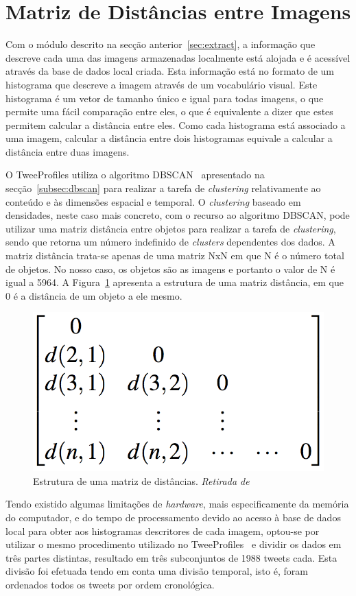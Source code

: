 \section{Matriz de Distâncias entre Imagens}\label{sec:matdist}

Com o módulo descrito na secção anterior~\ref{sec:extract}, a informação que descreve cada uma das imagens armazenadas localmente está alojada e é acessível através da base de dados local criada. Esta informação está no formato de um histograma que descreve a imagem através de um vocabulário visual. Este histograma é um vetor de tamanho único e igual para todas imagens, o que permite uma fácil comparação entre eles, o que é equivalente a dizer que estes permitem calcular a distância entre eles. Como cada histograma está associado a uma imagem, calcular a distância entre dois histogramas equivale a calcular a distância entre duas imagens.

O TweeProfiles utiliza o algoritmo DBSCAN~\cite{Han2006} apresentado na secção~\ref{subsec:dbscan} para realizar a tarefa de \textit{clustering} relativamente ao conteúdo e às dimensões espacial e temporal. O \textit{clustering} baseado em densidades, neste caso mais concreto, com o recurso ao algoritmo DBSCAN, pode utilizar uma matriz distância entre objetos para realizar a tarefa de \textit{clustering}, sendo que retorna um número indefinido de \textit{clusters} dependentes dos dados. A matriz distância trata-se apenas de uma matriz NxN em que N é o número total de objetos. No nosso caso, os objetos são as imagens e portanto o valor de N é igual a 5964. A Figura~\ref{fig:matriz} apresenta a estrutura de uma matriz distância, em que 0 é a distância de um objeto a ele mesmo.

\begin{figure}[h]
\centering
\includegraphics[width=0.3\linewidth]{./figures/matrizdist}
\caption{Estrutura de uma matriz de distâncias. \textit{Retirada de}~\cite{Han2006}}
\label{fig:matriz}
\end{figure}

Tendo existido algumas limitações de \textit{hardware}, mais especificamente da memória do computador, e do tempo de processamento devido ao acesso à base de dados local para obter aos histogramas descritores de cada imagem, optou-se por utilizar o mesmo procedimento utilizado no TweeProfiles~\cite{Cunha2013} e dividir os dados em três partes distintas, resultado em três subconjuntos de 1988 tweets cada. Esta divisão foi efetuada tendo em conta uma divisão temporal, isto é, foram ordenados todos os tweets por ordem cronológica.
 
